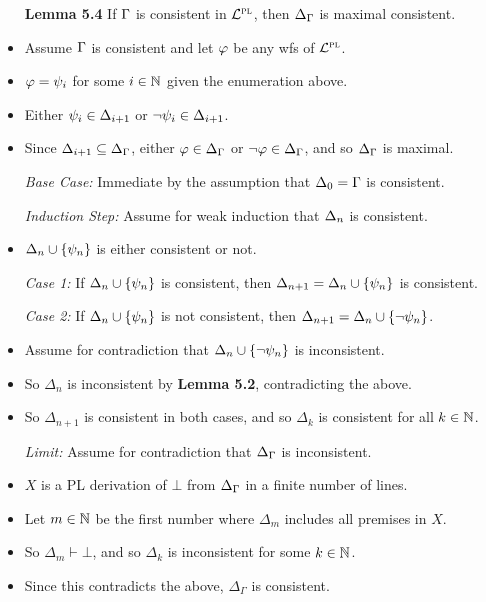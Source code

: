 \documentclass[a4paper, 11pt]{article} %
\begin{document}
\begin{itemize}
  \item[\bf Lemma 5.4] If $\Gamma$ is consistent in $\mathcal{L}^{\textsc{pl}}$, then $\Delta_{\Gamma}$ is maximal consistent. 
    \item Assume $\Gamma$ is consistent and let $\varphi$ be any wfs of $\mathcal{L}^{\textsc{pl}}$.
    \item $\varphi=\psi_i$ for some $i\in\mathbb{N}$ given the enumeration above.
    \item Either $\psi_i\in\Delta_{i+1}$ or $\neg\psi_i\in\Delta_{i+1}$.
    \item Since $\Delta_{i+1}\subseteq\Delta_{\Gamma}$, either $\varphi\in\Delta_{\Gamma}$ or $\neg\varphi\in\Delta_{\Gamma}$, and so $\Delta_{\Gamma}$ is maximal.
    \item[\it Base Case:] Immediate by the assumption that $\Delta_0 = \Gamma$ is consistent. 
    \item[\it Induction Step:] Assume for weak induction that $\Delta_n$ is consistent. 
      \item $\Delta_n\cup\lbrace\psi_n\rbrace$ is either consistent or not.
      \item[\it Case 1:] If $\Delta_n\cup\lbrace\psi_n\rbrace$ is consistent, then $\Delta_{n+1}=\Delta_n\cup\lbrace\psi_n\rbrace$ is consistent. 
      \item[\it Case 2:] If $\Delta_n\cup\lbrace\psi_n\rbrace$ is not consistent, then $\Delta_{n+1}=\Delta_n\cup\lbrace\neg\psi_n\rbrace$.
    \item Assume for contradiction that $\Delta_n\cup\lbrace\neg\psi_n\rbrace$ is inconsistent.
    \item So $\Delta_n$ is inconsistent by \textbf{Lemma 5.2}, contradicting the above. 
    \item So $\Delta_{n+1}$ is consistent in both cases, and so $\Delta_k$ is consistent for all $k \in \mathbb{N}$. 
    \item[\it Limit:] Assume for contradiction that $\Delta_{\Gamma}$ is inconsistent.
    \item $X$ is a PL derivation of $\bot$ from $\Delta_{\Gamma}$ in a finite number of lines.
    \item Let $m \in \mathbb{N}$ be the first number where $\Delta_m$ includes all premises in $X$.
    \item So $\Delta_m\vdash\bot$, and so $\Delta_k$ is inconsistent for some $k\in\mathbb{N}$.
    \item Since this contradicts the above, $\Delta_\Gamma$ is consistent. 
\end{itemize}
\end{document}
